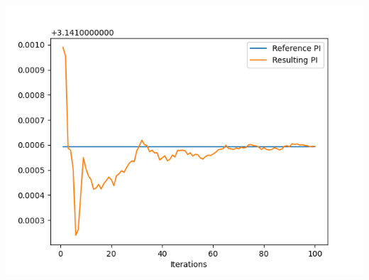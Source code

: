 \documentclass[english]{exam}
\begin{document}
\begin{center}
  \includegraphics[scale=0.65]{plot3.png}
\end{center}
\end{document}
